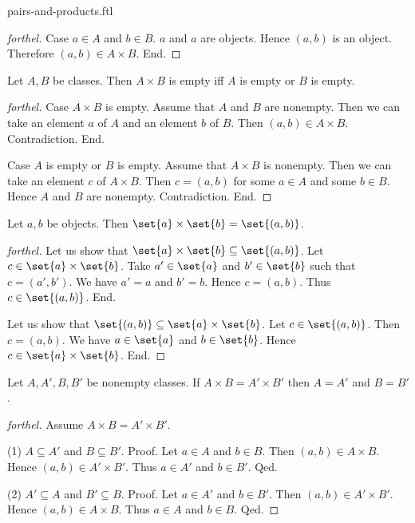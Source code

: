 \documentclass{naproche-library}
\begin{document}
\begin{smodule}{pairs-and-products.ftl}
\begin{proof}[forthel]
    Case $a \in A$ and $b \in B$.
      $a$ and $a$ are objects.
      Hence $(a, b)$ is an object.
      Therefore $(a, b) \in A \times B$.
    End.
  \end{proof}

  \begin{proposition}[forthel,id=FOUNDATIONS_04_2198552029691904]
    Let $A, B$ be classes.
    Then $A \times B$ is empty iff $A$ is empty or $B$ is empty.
  \end{proposition}
  \begin{proof}[forthel]
    Case $A \times B$ is empty.
      Assume that $A$ and $B$ are nonempty.
      Then we can take an element $a$ of $A$ and an element $b$ of $B$.
      Then $(a, b) \in A \times B$.
      Contradiction.
    End.

    Case $A$ is empty or $B$ is empty.
      Assume that $A \times B$ is nonempty.
      Then we can take an element $c$ of $A \times B$.
      Then $c = (a, b)$ for some $a \in A$ and some $b \in B$.
      Hence $A$ and $B$ are nonempty.
      Contradiction.
    End.
  \end{proof}

  \begin{proposition}[forthel,id=FOUNDATIONS_04_7971087096741888]
    Let $a, b$ be objects.
    Then $\set{a} \times \set{b} = \set{(a, b)}$.
  \end{proposition}
  \begin{proof}[forthel]
    Let us show that $\set{a} \times \set{b} \subseteq \set{(a, b)}$.
      Let $c \in \set{a} \times \set{b}$.
      Take $a' \in \set{a}$ and $b' \in \set{b}$ such that $c = (a', b')$.
      We have $a' = a$ and $b' = b$.
      Hence $c = (a, b)$.
      Thus $c \in \set{(a, b)}$.
    End.

    Let us show that $\set{(a, b)} \subseteq \set{a} \times \set{b}$.
      Let $c \in \set{(a, b)}$.
      Then $c = (a, b)$.
      We have $a \in \set{a}$ and $b \in \set{b}$.
      Hence $c \in \set{a} \times \set{b}$.
    End.
  \end{proof}

  \begin{proposition}[forthel,id=FOUNDATIONS_04_7456594440749056]
    Let $A, A', B, B'$ be nonempty classes.
    If $A \times B = A' \times B'$ then $A = A'$ and $B = B'$.
  \end{proposition}
  \begin{proof}[forthel]
    Assume $A \times B = A' \times B'$.

    (1) $A \subseteq A'$ and $B \subseteq B'$. \newline
    Proof.
      Let $a \in A$ and $b \in B$.
      Then $(a,b) \in A \times B$.
      Hence $(a,b) \in A' \times B'$.
      Thus $a \in A'$ and $b \in B'$.
    Qed.

    (2) $A' \subseteq A$ and $B' \subseteq B$. \newline
    Proof.
      Let $a \in A'$ and $b \in B'$.
      Then $(a,b) \in A' \times B'$.
      Hence $(a,b) \in A \times B$.
      Thus $a \in A$ and $b \in B$.
    Qed.
  \end{proof}
\end{smodule}
\end{document}
